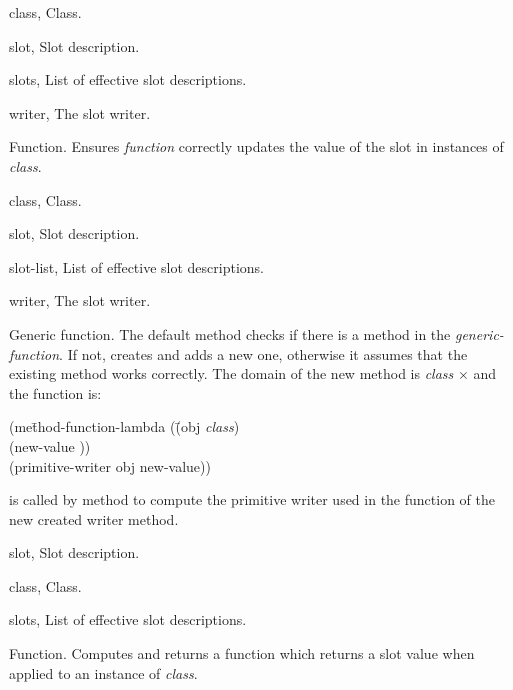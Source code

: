 \begin{optDefinition}
%
\begin{genericargs}
    \item[class, \classref{class}] Class.
    \item[slot, \classref{slot}] Slot description.
    \item[slots, \classref{list}] List of effective slot
    descriptions.
    \item[writer, \classref{function}] The slot writer.
\end{genericargs}
%
\result%
Function.
%
\remarks%
Ensures {\em function} correctly updates the value of the slot in
instances of {\em class}.

%
\begin{specargs}
    \item[class, \classref{class}] Class.
    \item[slot, \classref{slot}] Slot description.
    \item[slot-list, \classref{list}] List of effective slot
    descriptions.
    \item[writer, \classref{generic-function}] The slot writer.
\end{specargs}
%
\result%
Generic function.
%
\remarks%
The default method checks if there is a method in the {\em
generic-function}. If not, creates and adds a new one, otherwise it
assumes that the existing method works correctly. The domain of
the new method is {\em class} $\times$  and the
function is:
{\tt\begin{tabbing}
(me\=thod-function-lambda (\=(obj {\em class})\\
\>                      \>(new-value ))\\
   \>(primitive-writer obj new-value))
\end{tabbing}}
 is called by
 method to compute the primitive writer used in the
function of the new created writer method.

%
\begin{genericargs}
    \item[slot, \classref{slot}] Slot description.
    \item[class, \classref{class}] Class.
    \item[slots, \classref{list}] List of effective slot
    descriptions.
\end{genericargs}
%
\result%
Function.
%
\remarks%
Computes and returns a function which returns a slot value when
applied to an instance of {\em class}.


\end{optDefinition}
